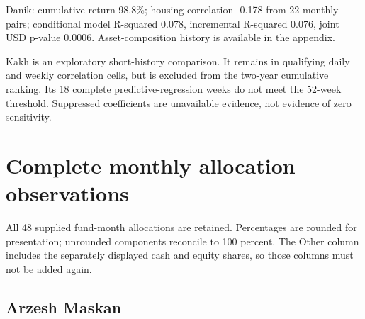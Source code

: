 \documentclass[11pt,a4paper]{article}
\begin{document}
Danik: cumulative return 98.8\%; housing correlation -0.178 from 22 monthly pairs; conditional model R-squared 0.078, incremental R-squared 0.076, joint USD p-value 0.0006. Asset-composition history is available in the appendix.

Kakh is an exploratory short-history comparison. It remains in qualifying daily and weekly correlation cells, but is excluded from the two-year cumulative ranking. Its 18 complete predictive-regression weeks do not meet the 52-week threshold. Suppressed coefficients are unavailable evidence, not evidence of zero sensitivity.

\appendix

\section{Complete monthly allocation observations}

All 48 supplied fund-month allocations are retained. Percentages are rounded for presentation; unrounded components reconcile to 100 percent. The Other column includes the separately displayed cash and equity shares, so those columns must not be added again.

\subsection{Arzesh Maskan}
\end{document}
